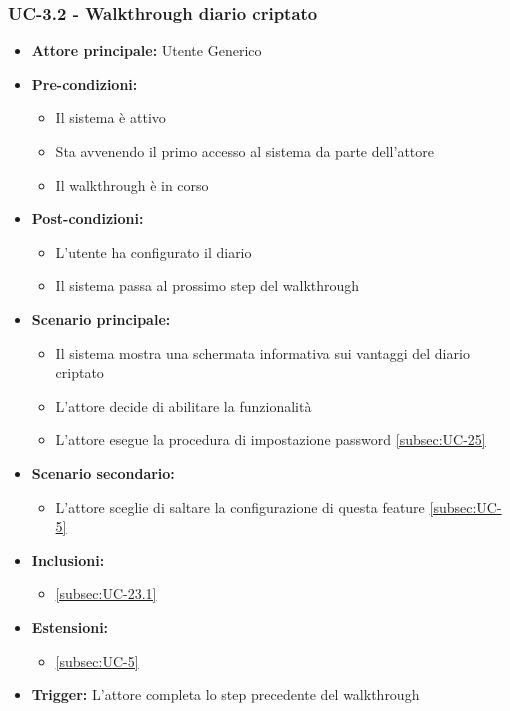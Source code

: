 \documentclass[a4paper,12pt]{article}
\begin{document}
\subsubsection{UC-3.2 - Walkthrough diario criptato} \label{subsec:UC-3.2}
\begin{itemize}
    \item \textbf{Attore principale:} Utente Generico
    \item \textbf{Pre-condizioni:}
    \begin{itemize}
        \item Il sistema è attivo
        \item Sta avvenendo il primo accesso al sistema da parte dell'attore
        \item Il walkthrough è in corso
    \end{itemize}
    \item \textbf{Post-condizioni:}
    \begin{itemize}
        \item L'utente ha configurato il diario
        \item Il sistema passa al prossimo step del walkthrough
    \end{itemize}
    \item \textbf{Scenario principale:}
    \begin{itemize}
        \item Il sistema mostra una schermata informativa sui vantaggi del diario criptato
        \item L'attore decide di abilitare la funzionalità
        \item L'attore esegue la procedura di impostazione password \ref{subsec:UC-25}
    \end{itemize}
    \item \textbf{Scenario secondario:}
    \begin{itemize}
        \item L'attore sceglie di saltare la configurazione di questa feature \ref{subsec:UC-5}
    \end{itemize}
    \item \textbf{Inclusioni:}
    \begin{itemize}
        \item \ref{subsec:UC-23.1}
    \end{itemize}
    \item \textbf{Estensioni:}
    \begin{itemize}
        \item \ref{subsec:UC-5}
    \end{itemize}
    \item \textbf{Trigger:} L'attore completa lo step precedente del walkthrough
\end{itemize}
\end{document}
